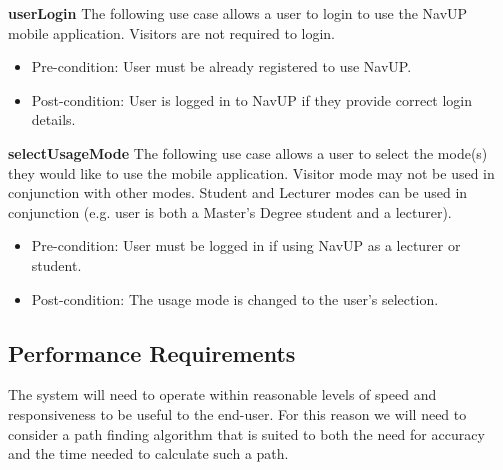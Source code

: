 \documentclass[12pt,a4paper]{article}
\begin{document}

		\textbf{userLogin}
			The following use case allows a user to login to use the NavUP mobile application. Visitors are not required to 				login.

		\begin{itemize}
		  \item Pre-condition: User must be already registered to use NavUP.
		   \item Post-condition: User is logged in to NavUP if they provide correct login details.
		\end{itemize}

	    \textbf{selectUsageMode}
	    The following use case allows a user to select the mode(s) they would like to use the mobile application. Visitor mode    		may not be used in conjunction with other modes. Student and Lecturer modes can be used in conjunction (e.g. user is 			both a Master's Degree student and a lecturer).

		\begin{itemize}
		  \item Pre-condition: User must be logged in if using NavUP as a lecturer or student.
		   \item Post-condition: The usage mode is changed to the user's selection.
		\end{itemize}


		\subsection{Performance Requirements}

			The system will need to operate within reasonable levels of speed and
			responsiveness to be useful to the end-user. For this reason we will need
			to consider a path finding algorithm that is suited to both the need for
			accuracy and the time needed to calculate such a path.

			\medskip


\end{document}
\end{itemize}
\end{document}
